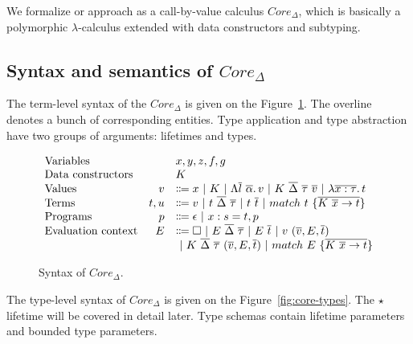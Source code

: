 \documentclass[11pt]{article}
\newcommand{\vor}{~|~}
\newcommand{\ap}{~}
\begin{document}
    We formalize or approach as a call-by-value calculus $Core_{\Delta}$, which is basically a polymorphic $\lambda$-calculus extended with data constructors and subtyping.

    \subsection{Syntax and semantics of $Core_\Delta$}

    The term-level syntax of the $Core_\Delta$ is given on the Figure~\ref{fig:core-syntax}.
    The overline denotes a bunch of corresponding entities.
    Type application and type abstraction have two groups of arguments: lifetimes and types.

    \begin{figure}
        \centering
        \[
            \begin{array}{lrl}
                \text{Variables} & & x, y, z, f, g \\
                \text{Data constructors} & & K \\
                \text{Values} &v &\Coloneqq x \vor K \vor \Lambda \overline{l}~\overline{\alpha} \ldotp v \vor K\ap\overline{\Delta}\ap \overline{\tau} \ap \overline{v} \vor \lambda \overline{x : \tau}\ldotp t
                \\
                \text{Terms} &t, u &\Coloneqq v \vor t\ap\overline{\Delta}\ap\overline{\tau} \vor t\ap \overline{t} \vor match ~ t ~\{\overline{K \ap \overline{x} \to t}\}
                \\
                \text{Programs} &p &\Coloneqq \epsilon \vor x : s = t, p
                \\
                \text{Evaluation context} & E & \Coloneqq \square \vor E \ap\overline{\Delta}\ap \overline{\tau} \vor E \ap \overline{t} \vor v \ap (\overline{v}, E, \overline{t}) \\
                && \vor K\ap\overline{\Delta}\ap\overline{\tau}\ap(\overline{v}, E, \overline{t}) \vor match\ap E\ap \{\overline{K\ap\overline{x}\to t}\}
            \end{array}
        \]
        \caption{Syntax of $Core_\Delta$.}
        \label{fig:core-syntax}
    \end{figure}

    The type-level syntax of $Core_\Delta$ is given on the Figure\ \ref{fig:core-types}.
    The $\star$ lifetime will be covered in detail later. %
    Type schemas contain lifetime parameters and bounded type parameters.
\end{document}
